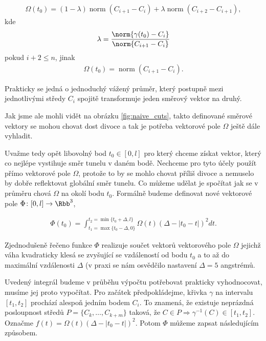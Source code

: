 \begin{align}
    \Omega(t_0) =
            (1 - \lambda) \operatorname{norm}(C_{i + 1} - C_i)
            +
            \lambda \operatorname{norm}(C_{i + 2} - C_{i + 1})
        ,
\end{align}
kde
\begin{align}
    \lambda = \frac{\norm{\gamma(t_0) - C_i}}{\norm{C_{i + 1} - C_i}}
\end{align}
pokud $ i + 2 \leq n $, jinak
\begin{align}
    \Omega(t_0) = \operatorname{norm}(C_{i + 1} - C_i).
\end{align}

Prakticky se jedná o jednoduchý vážený průměr, který postupně mezi jednotlivými středy
$ C_i $ spojitě transformuje jeden směrový vektor na druhý.

Jak jsme ale mohli vidět na obrázku \ref{fig:naive_cuts}, takto definované
směrové vektory se mohou chovat dost divoce a tak je potřeba vektorové pole
$ \Omega $ ještě dále vyhladit.

Uvažme tedy opět libovolný bod $ t_0 \in [0, l] $ pro který chceme získat vektor,
který co nejlépe vystihuje směr tunelu v daném bodě. Nechceme pro tyto účely použít
přímo vektorové pole $ \Omega $, protože to by se mohlo chovat příliš divoce
a nemuselo by dobře reflektovat globální směr tunelu. Co můžeme udělat je spočítat
jak se v průměru chová $ \Omega $ na okolí bodu $ t_0 $. Formálně budeme
definovat nové vektorové pole $ \Phi \colon [0, l] \to \Rbb^3 $,

\begin{align}
    \Phi(t_0) = \int_{t_1 = \max\{t_0 - \Delta, 0\}}^{t_2 = \min\{t_0 + \Delta, l\}}
        \Omega(t) (\Delta - \left| t_0 - t \right| )^2 dt.
\end{align}

Zjednodušeně řečeno funkce $ \Phi $ realizuje součet vektorů vektorového pole
$ \Omega $ jejichž váha kvadraticky klesá se zvyšující se vzdáleností od bodu
$ t_0 $ a to až do maximální vzdálenosti $ \Delta $ (v praxi se nám osvědčilo
nastavení $ \Delta = 5$ angstrémů.

Uvedený integrál budeme v průběhu výpočtu potřebovat prakticky vyhodnocovat,
musíme jej proto vypočítat. Pro začátek předpokládejme, křivka $ \gamma $ na
intervalu $ [t_1, t_2] $ prochází alespoň jedním bodem $ C_i $. To znamená, že
existuje neprázdná posloupnost středů $ P = \{C_k, \dots, C_{k + m} \}$ taková, že
$ C \in P \Rightarrow \gamma^{-1}(C) \in [t_1, t_2]$. Označme
$ f(t) = \Omega(t) (\Delta - \left| t_0 - t \right| )^2 $. Potom $ \Phi $ můžeme zapsat
následujícím způsobem.

